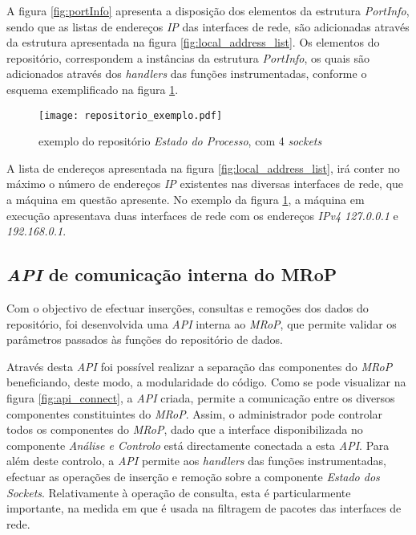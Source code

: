 A figura \ref{fig:portInfo} apresenta a disposição dos elementos da estrutura \textit{PortInfo}, sendo que as listas de endereços \textit{IP} das interfaces de rede, são adicionadas através da estrutura apresentada na figura \ref{fig:local_address_list}.
Os elementos do repositório, correspondem a instâncias da estrutura \textit{PortInfo}, os quais são adicionados através dos \textit{handlers} das funções instrumentadas, conforme o esquema exemplificado na figura \ref{fig:repo_example}.

\begin{figure}[!htbp]
\centering
\texttt{[image: repositorio\_exemplo.pdf]}
\caption{exemplo do repositório \textit{Estado do Processo}, com 4 \textit{sockets}}
\label{fig:repo_example}
\end{figure}

A lista de endereços apresentada na figura \ref{fig:local_address_list}, irá conter no máximo o número de endereços \textit{IP} existentes nas diversas interfaces de rede, que a máquina em questão apresente.
No exemplo da figura \ref{fig:repo_example}, a máquina em execução apresentava duas interfaces de rede com os endereços \textit{IPv4 127.0.0.1} e \textit{192.168.0.1}.

\subsection{\textit{API} de comunicação interna do MRoP}
\label{sub:repo_api}

Com o objectivo de efectuar inserções, consultas e remoções dos dados do repositório, foi desenvolvida uma \textit{API} interna ao \textit{MRoP}, que permite validar os parâmetros passados às funções do repositório de dados.

Através desta \textit{API} foi possível realizar a separação das componentes do \textit{MRoP} beneficiando, deste modo, a modularidade do código.
Como se pode visualizar na figura \ref{fig:api_connect}, a \textit{API} criada, permite a comunicação entre os diversos componentes constituintes do \textit{MRoP}.
Assim, o administrador pode controlar todos os componentes do \textit{MRoP}, dado que a interface disponibilizada no componente \textit{Análise e Controlo} está directamente conectada a esta \textit{API}.
Para além deste controlo, a \textit{API} permite aos \textit{handlers} das funções instrumentadas, efectuar as operações de inserção e remoção sobre a componente \textit{Estado dos Sockets}.
Relativamente à operação de consulta, esta é particularmente importante, na medida em que é usada na filtragem de pacotes das interfaces de rede.

